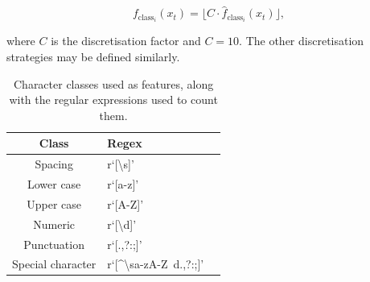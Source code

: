 \begin{equation}
f_{\text{class}_i}(x_t) = \big\lfloor C \cdot\hat f_{\text{class}_i}(x_t)\big\rfloor,
\label{eq:classfunctionsdisc}
\end{equation}

where $C$ is the discretisation factor and $C = 10$. The other discretisation strategies may be defined similarly.

\begin{table}[h]
\begin{center}
\begin{tabular}{|c|l|l|}
\hline
Class & Regex\\
\hline
Spacing & r`[\textbackslash s]'\\
Lower case & r`[a-z]'\\
Upper case & r`[A-Z]'\\
Numeric & r`[\textbackslash d]'\\
Punctuation & r`[\(\).,?:;]'\\
Special character & r`[\^{}\textbackslash sa-zA-Z\ d\(\).,?:;]'\\
\hline
\end{tabular}
\caption[Character classes used as features, along with the regular expressions used to count them.]{Character classes used as features, along with the regular expressions used to count them.}
\label{table:characterclasses}
\end{center}
\end{table}

